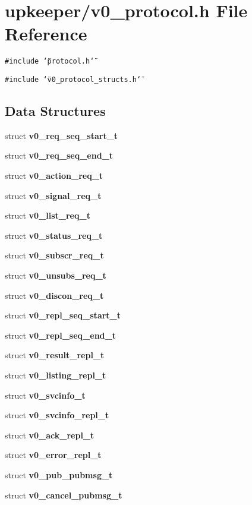 \section{upkeeper/v0\_\-protocol.h File Reference}
\label{v0__protocol_8h}
{\tt \#include \char`\"{}protocol.h\char`\"{}}\par
{\tt \#include \char`\"{}v0\_\-protocol\_\-structs.h\char`\"{}}\par
\subsection*{Data Structures}
\begin{CompactItemize}
\item 
struct \bf{v0\_\-req\_\-seq\_\-start\_\-t}
\item 
struct \bf{v0\_\-req\_\-seq\_\-end\_\-t}
\item 
struct \bf{v0\_\-action\_\-req\_\-t}
\item 
struct \bf{v0\_\-signal\_\-req\_\-t}
\item 
struct \bf{v0\_\-list\_\-req\_\-t}
\item 
struct \bf{v0\_\-status\_\-req\_\-t}
\item 
struct \bf{v0\_\-subscr\_\-req\_\-t}
\item 
struct \bf{v0\_\-unsubs\_\-req\_\-t}
\item 
struct \bf{v0\_\-discon\_\-req\_\-t}
\item 
struct \bf{v0\_\-repl\_\-seq\_\-start\_\-t}
\item 
struct \bf{v0\_\-repl\_\-seq\_\-end\_\-t}
\item 
struct \bf{v0\_\-result\_\-repl\_\-t}
\item 
struct \bf{v0\_\-listing\_\-repl\_\-t}
\item 
struct \bf{v0\_\-svcinfo\_\-t}
\item 
struct \bf{v0\_\-svcinfo\_\-repl\_\-t}
\item 
struct \bf{v0\_\-ack\_\-repl\_\-t}
\item 
struct \bf{v0\_\-error\_\-repl\_\-t}
\item 
struct \bf{v0\_\-pub\_\-pubmsg\_\-t}
\item 
struct \bf{v0\_\-cancel\_\-pubmsg\_\-t}
\end{CompactItemize}
